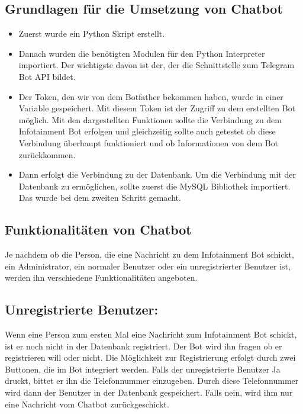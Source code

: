 \subsection{Grundlagen für die Umsetzung von Chatbot}
\begin{itemize}
	\item Zuerst wurde ein Python Skript erstellt.
\end{itemize}
\begin{itemize}
	\item Danach wurden die benötigten Modulen für den Python Interpreter importiert.  Der wichtigste davon ist der, der die Schnittstelle zum Telegram Bot API bildet.
\end{itemize}
\begin{itemize}
	\item Der Token, den wir von dem Botfather bekommen haben, wurde in einer Variable gespeichert. Mit diesem Token ist der Zugriff zu dem erstellten Bot möglich. Mit den dargestellten Funktionen sollte die Verbindung zu dem Infotainment Bot erfolgen und gleichzeitig sollte auch getestet ob diese Verbindung überhaupt funktioniert und ob Informationen von dem Bot zurückkommen. 

\end{itemize}
\begin{itemize}
	\item Dann erfolgt die Verbindung zu der Datenbank. Um die Verbindung mit der Datenbank zu ermöglichen, sollte zuerst die MySQL Bibliothek importiert. Das wurde bei dem zweiten Schritt gemacht. 
\end{itemize}
\subsection{Funktionalitäten von Chatbot}
Je nachdem ob die Person, die eine Nachricht zu dem Infotainment Bot schickt, ein Administrator, ein normaler Benutzer oder ein unregistrierter Benutzer ist, werden ihn verschiedene Funktionalitäten angeboten. 
\subsection{Unregistrierte Benutzer:}
Wenn eine Person zum ersten Mal eine Nachricht zum Infotainment Bot schickt, ist er noch nicht in der Datenbank registriert. Der Bot wird ihn fragen ob er registrieren will oder nicht. Die Möglichkeit zur Registrierung erfolgt durch zwei Buttonen, die im Bot integriert werden. Falls der unregistrierte Benutzer Ja druckt, bittet er ihn die Telefonnummer einzugeben. Durch diese Telefonnummer wird dann der Benutzer in der Datenbank gespeichert. Falls nein, wird ihm nur eine Nachricht vom Chatbot zurückgeschickt. 

